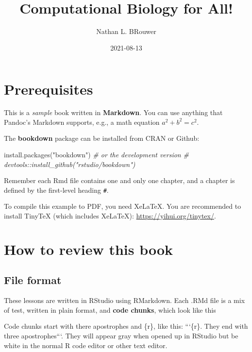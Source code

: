 \documentclass[
]{book}
\title{Computational Biology for All!}
\author{Nathan L. BRouwer}
\date{2021-08-13}
\newenvironment{Shaded}{\begin{snugshade}}{\end{snugshade}}
\newcommand{\CommentTok}[1]{\textcolor[rgb]{0.56,0.35,0.01}{\textit{#1}}}
\newcommand{\FunctionTok}[1]{\textcolor[rgb]{0.00,0.00,0.00}{#1}}
\newcommand{\NormalTok}[1]{#1}
\newcommand{\StringTok}[1]{\textcolor[rgb]{0.31,0.60,0.02}{#1}}
\begin{document}
\maketitle

{
\setcounter{tocdepth}{1}
\tableofcontents
}
\hypertarget{prerequisites}{%
\chapter{Prerequisites}\label{prerequisites}}

This is a \emph{sample} book written in \textbf{Markdown}. You can use anything that Pandoc's Markdown supports, e.g., a math equation \(a^2 + b^2 = c^2\).

The \textbf{bookdown} package can be installed from CRAN or Github:

\begin{Shaded}
\begin{Highlighting}[]
\FunctionTok{install.packages}\NormalTok{(}\StringTok{"bookdown"}\NormalTok{)}
\CommentTok{\# or the development version}
\CommentTok{\# devtools::install\_github("rstudio/bookdown")}
\end{Highlighting}
\end{Shaded}

Remember each Rmd file contains one and only one chapter, and a chapter is defined by the first-level heading \texttt{\#}.

To compile this example to PDF, you need XeLaTeX. You are recommended to install TinyTeX (which includes XeLaTeX): \url{https://yihui.org/tinytex/}.

\hypertarget{how-to-review-this-book}{%
\chapter{How to review this book}\label{how-to-review-this-book}}

\hypertarget{file-format}{%
\section{File format}\label{file-format}}

These lessons are written in RStudio using RMarkdown. Each .RMd file is a mix of test, written in plain format, and \textbf{code chunks}, which look like this

Code chunks start with there apostrophes and \{r\}, like this: ```\{r\}. They end with three apostrophes```. They will appear gray when opened up in RStudio but be white in the normal R code editor or other text editor.
\end{document}
